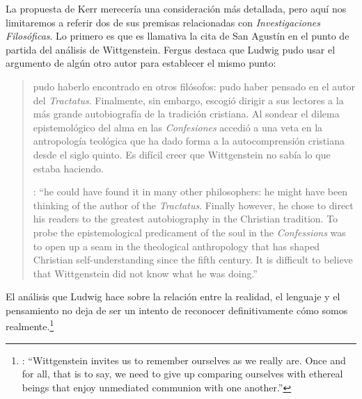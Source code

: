 La propuesta de Kerr merecería una consideración más detallada, pero aquí nos limitaremos a referir dos de sus premisas relacionadas con \emph{Investigaciones Filosóficas}. Lo primero es que es llamativa la cita de San Agustín en el punto de partida del análisis de Wittgenstein. Fergus destaca que Ludwig pudo usar el argumento de algún otro autor para establecer el mismo punto: \blockquote[{\cite[42]{kerr1997theo}}: \enquote{he could have found it in many other philosophers: he might have been thinking of the author of the \emph{Tractatus}. Finally however, he chose to direct his readers to the greatest autobiography in the Christian tradition. To probe the epistemological predicament of the soul in the \emph{Confessions} was to open up a seam in the theological anthropology that has shaped Christian self-understanding since the fifth century. It is difficult to believe that Wittgenstein did not know what he was doing.}]{pudo haberlo encontrado en otros filósofos: pudo haber pensado en el autor del \emph{Tractatus}. Finalmente, sin embargo, escogió dirigir a sus lectores a la más grande autobiografía de la tradición cristiana. Al sondear el dilema epistemológico del alma en las \emph{Confesiones} accedió a una veta en la antropología teológica que ha dado forma a la autocomprensión cristiana desde el siglo quinto. Es difícil creer que Wittgenstein no sabía lo que estaba haciendo.} El análisis que Ludwig hace sobre la relación entre la realidad, el lenguaje y el pensamiento no deja de ser un intento de reconocer definitivamente cómo somos realmente.\footnote{\cite[Cf.~][23]{kerr1997theo}: \enquote{Wittgenstein invites us to remember ourselves as we really are. Once and for all, that is to say, we need to give up comparing ourselves with ethereal beings that enjoy unmediated communion with one another.}}

